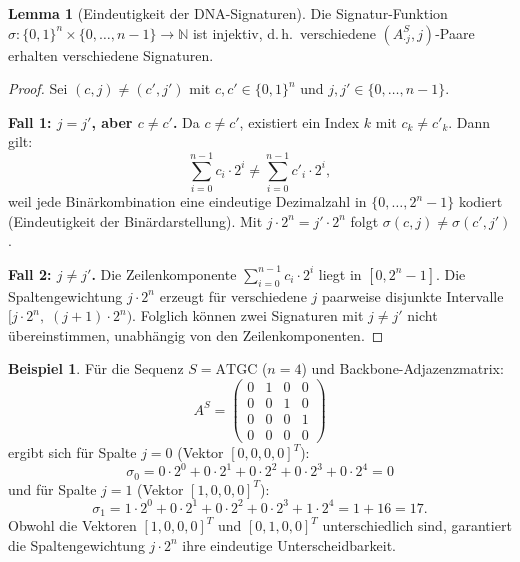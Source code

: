 ﻿\documentclass[a4paper,12pt]{article}
\theoremstyle{definition}
\newtheorem{beispiel}{Beispiel}
\newtheorem{lemma}{Lemma}
\begin{document}
\begin{lemma}[Eindeutigkeit der DNA-Signaturen]
    \label{lem:eindeutigkeit}
    Die Signatur-Funktion $\sigma: \{0,1\}^n \times \{0,\ldots,n-1\} \to \mathbb{N}$
    ist injektiv, d.\,h.\  verschiedene $(A^S_{\cdot j}, j)$-Paare erhalten
    verschiedene Signaturen.
\end{lemma}

\begin{proof}
    Sei $(c, j) \neq (c', j')$ mit $c, c' \in \{0,1\}^n$ und
    $j, j' \in \{0, \ldots, n-1\}$.

    \textbf{Fall 1: $j = j'$, aber $c \neq c'$.}
    Da $c \neq c'$, existiert ein Index $k$ mit $c_k \neq c'_k$.
    Dann gilt:
    \[
        \sum_{i=0}^{n-1} c_i \cdot 2^i \neq \sum_{i=0}^{n-1} c'_i \cdot 2^i,
    \]
    weil jede Binärkombination eine eindeutige Dezimalzahl in
    $\{0, \ldots, 2^n - 1\}$ kodiert (Eindeutigkeit der Binärdarstellung).
    Mit $j \cdot 2^n = j' \cdot 2^n$ folgt $\sigma(c, j) \neq \sigma(c', j')$.

    \textbf{Fall 2: $j \neq j'$.}
    Die Zeilenkomponente $\sum_{i=0}^{n-1} c_i \cdot 2^i$ liegt in
    $[0, 2^n - 1]$. Die Spaltengewichtung $j \cdot 2^n$ erzeugt für verschiedene
    $j$ paarweise disjunkte Intervalle $[j \cdot 2^n,\; (j+1) \cdot 2^n)$.
    Folglich können zwei Signaturen mit $j \neq j'$ nicht \"{u}bereinstimmen,
    unabh\"{a}ngig von den Zeilenkomponenten. 
\end{proof}

\begin{beispiel}
    F\"{u}r die Sequenz $S = \text{ATGC}$ ($n = 4$) und Backbone-Adjazenzmatrix:
    \[
        A^S = \begin{pmatrix}
            0 & 1 & 0 & 0 \\
            0 & 0 & 1 & 0 \\
            0 & 0 & 0 & 1 \\
            0 & 0 & 0 & 0
        \end{pmatrix}
    \]
    ergibt sich für Spalte $j = 0$ (Vektor $[0,0,0,0]^T$):
    \[
        \sigma_0 = 0 \cdot 2^0 + 0 \cdot 2^1 + 0 \cdot 2^2 + 0 \cdot 2^3
                 + 0 \cdot 2^4 = 0
    \]
    und für Spalte $j = 1$ (Vektor $[1,0,0,0]^T$):
    \[
        \sigma_1 = 1 \cdot 2^0 + 0 \cdot 2^1 + 0 \cdot 2^2 + 0 \cdot 2^3
                 + 1 \cdot 2^4 = 1 + 16 = 17.
    \]
    Obwohl die Vektoren $[1,0,0,0]^T$ und $[0,1,0,0]^T$ unterschiedlich sind,
    garantiert die Spaltengewichtung $j \cdot 2^n$ ihre eindeutige Unterscheidbarkeit.
\end{beispiel}
\end{document}
